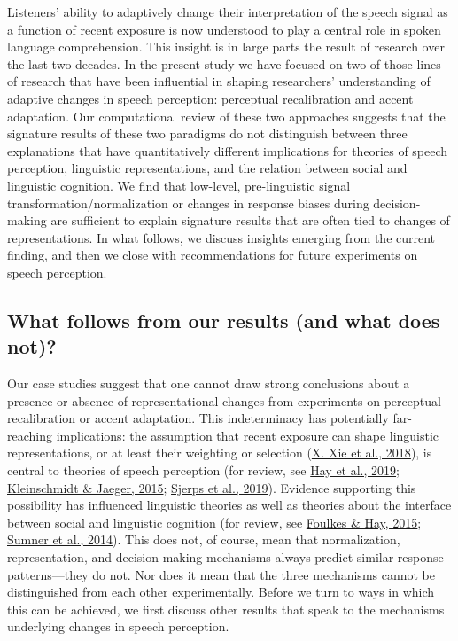 \documentclass[
  11pt,
  english,
  man,floatsintext]{apa6}
\begin{document}
Listeners' ability to adaptively change their interpretation of the speech signal as a function of recent exposure is now understood to play a central role in spoken language comprehension. This insight is in large parts the result of research over the last two decades. In the present study we have focused on two of those lines of research that have been influential in shaping researchers' understanding of adaptive changes in speech perception: perceptual recalibration and accent adaptation. Our computational review of these two approaches suggests that the signature results of these two paradigms do not distinguish between three explanations that have quantitatively different implications for theories of speech perception, linguistic representations, and the relation between social and linguistic cognition. We find that low-level, pre-linguistic signal transformation/normalization or changes in response biases during decision-making are sufficient to explain signature results that are often tied to changes of representations. In what follows, we discuss insights emerging from the current finding, and then we close with recommendations for future experiments on speech perception.

\hypertarget{what-follows-from-our-results-and-what-does-not}{%
\subsection{What follows from our results (and what does not)?}\label{what-follows-from-our-results-and-what-does-not}}

Our case studies suggest that one cannot draw strong conclusions about a presence or absence of representational changes from experiments on perceptual recalibration or accent adaptation. This indeterminacy has potentially far-reaching implications: the assumption that recent exposure can shape linguistic representations, or at least their weighting or selection (\protect\hyperlink{ref-xie2018jasa}{X. Xie et al., 2018}), is central to theories of speech perception (for review, see \protect\hyperlink{ref-hay2019}{Hay et al., 2019}; \protect\hyperlink{ref-kleinschmidt-jaeger2015}{Kleinschmidt \& Jaeger, 2015}; \protect\hyperlink{ref-sjerps2019}{Sjerps et al., 2019}). Evidence supporting this possibility has influenced linguistic theories as well as theories about the interface between social and linguistic cognition (for review, see \protect\hyperlink{ref-foulkes-hay2015}{Foulkes \& Hay, 2015}; \protect\hyperlink{ref-sumner2014}{Sumner et al., 2014}). This does not, of course, mean that normalization, representation, and decision-making mechanisms always predict similar response patterns---they do not. Nor does it mean that the three mechanisms cannot be distinguished from each other experimentally. Before we turn to ways in which this can be achieved, we first discuss other results that speak to the mechanisms underlying changes in speech perception.
\end{document}
